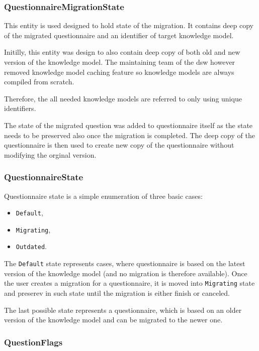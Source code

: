 \subsubsection*{QuestionnaireMigrationState}

This entity is used designed to hold state of the migration.
It contains deep copy of the migrated questionnaire and an identifier of target knowledge model.

Initilly, this entity was design to also contain deep copy of both old and new version of the knowledge model.
The maintaining team of the \gls{dsw} however removed knowledge model caching feature so knowledge models are always compiled from scratch\cite{gh-dsw-release-1.5}.

Therefore, the all needed knowledge models are referred to only using unique identifiers.

The state of the migrated question was added to questionnaire itself as the state needs to be preserved also once the migration is completed.
The deep copy of the questionnaire is then used to create new copy of the questionnaire without modifying the orginal version.

\subsubsection*{QuestionnaireState}

Questionnaire state is a simple enumeration of three basic cases:

\begin{itemize}
    \item \texttt{Default},
    \item \texttt{Migrating},
    \item \texttt{Outdated}.
\end{itemize}

The \texttt{Default} state represents cases, where questionnaire is based on the latest version of the knowledge model (and no migration is therefore available).
Once the user creates a migration for a questionnaire, it is moved into \texttt{Migrating} state and preserev in such state until the migration is either finish or canceled.

The last possible state represents a questionnaire, which is based on an older version of the knowledge model and can be migrated to the newer one.

\subsubsection*{QuestionFlags}

